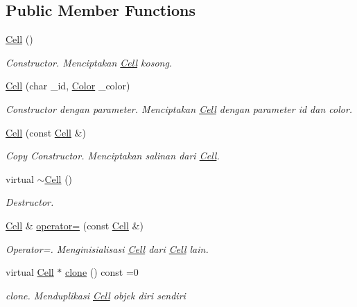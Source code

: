 \subsection*{Public Member Functions}
\begin{DoxyCompactItemize}
\item 
\hyperlink{classCell_a394510643e8664cf12b5efaf5cb99f71}{Cell} ()
\begin{DoxyCompactList}\small\item\em Constructor. Menciptakan \hyperlink{classCell}{Cell} kosong. \end{DoxyCompactList}\item 
\hyperlink{classCell_a86fe9c1022b8f52158e5bc3de3ee7e0c}{Cell} (char \+\_\+id, \hyperlink{color_8h_ab87bacfdad76e61b9412d7124be44c1c}{Color} \+\_\+color)
\begin{DoxyCompactList}\small\item\em Constructor dengan parameter. Menciptakan \hyperlink{classCell}{Cell} dengan parameter id dan color. \end{DoxyCompactList}\item 
\hyperlink{classCell_a8ca000885181236a713963c5c8bdb46f}{Cell} (const \hyperlink{classCell}{Cell} \&)
\begin{DoxyCompactList}\small\item\em Copy Constructor. Menciptakan salinan dari \hyperlink{classCell}{Cell}. \end{DoxyCompactList}\item 
virtual \hyperlink{classCell_a9fa559f7a28e2b4336c6879ca09304d8}{$\sim$\+Cell} ()
\begin{DoxyCompactList}\small\item\em Destructor. \end{DoxyCompactList}\item 
\hyperlink{classCell}{Cell} \& \hyperlink{classCell_a1c8f1c38098f3b4cbf5126bf218b468d}{operator=} (const \hyperlink{classCell}{Cell} \&)
\begin{DoxyCompactList}\small\item\em Operator=. Menginisialisasi \hyperlink{classCell}{Cell} dari \hyperlink{classCell}{Cell} lain. \end{DoxyCompactList}\item 
virtual \hyperlink{classCell}{Cell} $\ast$ \hyperlink{classCell_aafd03896d9a6131f14273752f9fb9815}{clone} () const =0
\begin{DoxyCompactList}\small\item\em clone. Menduplikasi \hyperlink{classCell}{Cell} objek diri sendiri \end{DoxyCompactList}\end{DoxyCompactItemize}
